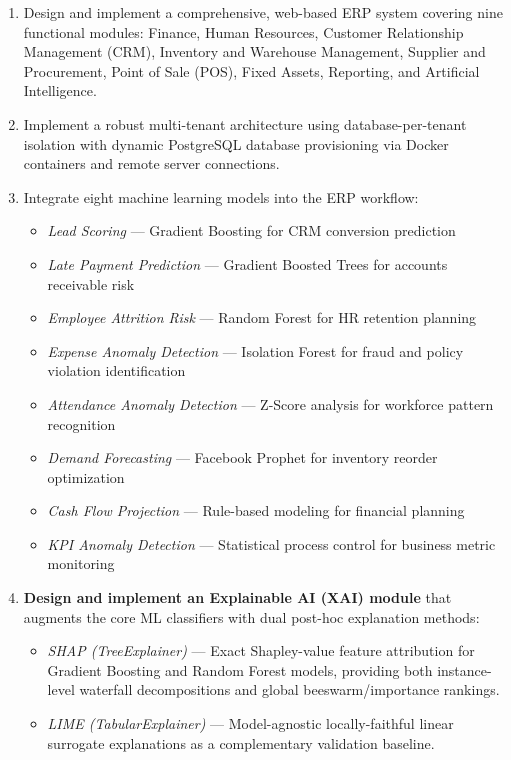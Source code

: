 \documentclass[12pt,a4paper]{report}
\begin{document}
\begin{enumerate}[label=\arabic*.]
  \item Design and implement a comprehensive, web-based ERP system covering nine functional modules: Finance, Human Resources, Customer Relationship Management (CRM), Inventory and Warehouse Management, Supplier and Procurement, Point of Sale (POS), Fixed Assets, Reporting, and Artificial Intelligence.

  \item Implement a robust multi-tenant architecture using database-per-tenant isolation with dynamic PostgreSQL database provisioning via Docker containers and remote server connections.

  \item Integrate eight machine learning models into the ERP workflow:
  \begin{itemize}
    \item \textit{Lead Scoring} --- Gradient Boosting for CRM conversion prediction
    \item \textit{Late Payment Prediction} --- Gradient Boosted Trees for accounts receivable risk
    \item \textit{Employee Attrition Risk} --- Random Forest for HR retention planning
    \item \textit{Expense Anomaly Detection} --- Isolation Forest for fraud and policy violation identification
    \item \textit{Attendance Anomaly Detection} --- Z-Score analysis for workforce pattern recognition
    \item \textit{Demand Forecasting} --- Facebook Prophet for inventory reorder optimization
    \item \textit{Cash Flow Projection} --- Rule-based modeling for financial planning
    \item \textit{KPI Anomaly Detection} --- Statistical process control for business metric monitoring
  \end{itemize}

  \item \textbf{Design and implement an Explainable AI (XAI) module} that augments the core ML classifiers with dual post-hoc explanation methods:
  \begin{itemize}
    \item \textit{SHAP (TreeExplainer)} --- Exact Shapley-value feature attribution for Gradient Boosting and Random Forest models, providing both instance-level waterfall decompositions and global beeswarm/importance rankings.
    \item \textit{LIME (TabularExplainer)} --- Model-agnostic locally-faithful linear surrogate explanations as a complementary validation baseline.
  \end{itemize}


\end{enumerate}
\end{document}
